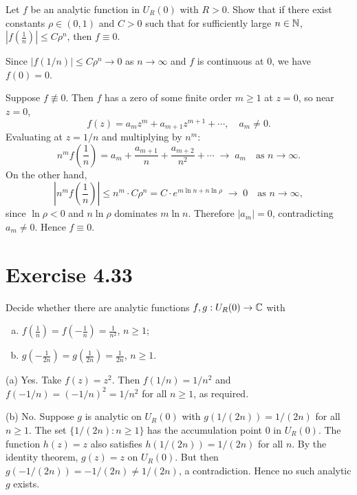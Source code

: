 \documentclass{article}
\begin{document}
Let $f$ be an analytic function in $U_R(0)$ with $R > 0$.
Show that if there exist constants $\rho \in (0,1)$ and $C > 0$
such that for sufficiently large $n \in \mathbb{N}$,
$|f(\tfrac{1}{n})| \le C\rho^n$,
then $f \equiv 0$.

\begin{solution}
  Since $|f(1/n)| \le C\rho^n \to 0$ as $n \to \infty$ and $f$ is
  continuous at $0$, we have $f(0) = 0$.

  Suppose $f \not\equiv 0$. Then $f$ has a zero of some finite order
  $m \ge 1$ at $z = 0$, so near $z = 0$,
  \[
    f(z) = a_m z^m + a_{m+1} z^{m+1} + \cdots, \quad a_m \ne 0.
  \]
  Evaluating at $z = 1/n$ and multiplying by $n^m$:
  \[
    n^m f\!\left(\frac{1}{n}\right)
    = a_m + \frac{a_{m+1}}{n} + \frac{a_{m+2}}{n^2} + \cdots
    \;\longrightarrow\; a_m \quad \text{as } n \to \infty.
  \]
  On the other hand,
  \[
    \left|n^m f\!\left(\frac{1}{n}\right)\right|
    \le n^m \cdot C\rho^n
    = C \cdot e^{m\ln n + n\ln\rho}
    \;\longrightarrow\; 0 \quad \text{as } n \to \infty,
  \]
  since $\ln\rho < 0$ and $n\ln\rho$ dominates $m\ln n$.
  Therefore $|a_m| = 0$, contradicting $a_m \ne 0$.
  Hence $f \equiv 0$.
\end{solution}

\section{Exercise 4.33}

Decide whether there are analytic functions
$f, g : U_R(0) \to \mathbb{C}$ with
\begin{enumerate}[(a)]
  \item $f(\tfrac{1}{n}) = f(-\tfrac{1}{n}) = \tfrac{1}{n^2}$,
    $n \ge 1$;
  \item $g(-\tfrac{1}{2n}) = g(\tfrac{1}{2n}) = \tfrac{1}{2n}$,
    $n \ge 1$.
\end{enumerate}

\begin{solution}
  (a) Yes. Take $f(z) = z^2$. Then
  $f(1/n) = 1/n^2$ and $f(-1/n) = (-1/n)^2 = 1/n^2$
  for all $n \ge 1$, as required.

  \medskip
  (b) No. Suppose $g$ is analytic on $U_R(0)$ with
  $g(1/(2n)) = 1/(2n)$ for all $n \ge 1$.
  The set $\{1/(2n) : n \ge 1\}$ has the accumulation point $0$
  in $U_R(0)$. The function $h(z) = z$ also satisfies
  $h(1/(2n)) = 1/(2n)$ for all $n$.
  By the identity theorem, $g(z) = z$ on $U_R(0)$.
  But then $g(-1/(2n)) = -1/(2n) \ne 1/(2n)$, a contradiction.
  Hence no such analytic $g$ exists.
\end{solution}
\end{document}
